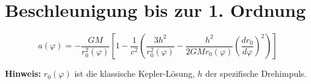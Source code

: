 \section{Beschleunigung bis zur 1. Ordnung}
\[ a(\varphi) = -\frac{GM}{r_0^2(\varphi)} \left[ 
1 - \frac{1}{c^2} \left( 
\frac{3h^2}{r_0^2(\varphi)} - \frac{h^2}{2GM r_0(\varphi)} \left(\frac{dr_0}{d\varphi}\right)^2 
\right) 
\right] \]

\textbf{Hinweis:} \( r_0(\varphi) \) ist die klassische Kepler-Lösung, \( h \) der spezifische Drehimpuls.
